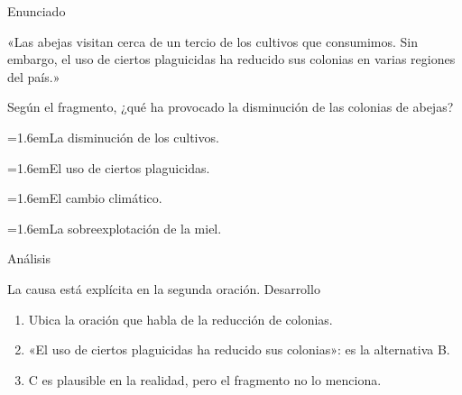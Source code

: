 \documentclass[10pt,a4paper,twocolumn]{article}
\newcommand{\alternativa}[2]{\par\noindent\hangindent=1.6em\hangafter=1\makebox[1.6em][l]{\tecla{#1}}#2\par}
\newcommand{\clave}[1]{\par\smallskip{\sffamily\footnotesize\color{esmeralda} Clave \teclaok{#1}}\par}
\begin{document}
\begin{ejemplo}
{\sffamily\footnotesize\color{zinc500} Enunciado}\par
«Las abejas visitan cerca de un tercio de los cultivos que consumimos. Sin embargo, el uso de ciertos plaguicidas ha reducido sus colonias en varias regiones del país.»

Según el fragmento, ¿qué ha provocado la disminución de las colonias de abejas?
\alternativa{A}{La disminución de los cultivos.}
\alternativa{B}{El uso de ciertos plaguicidas.}
\alternativa{C}{El cambio climático.}
\alternativa{D}{La sobreexplotación de la miel.}
\clave{B}
{\sffamily\footnotesize\color{zinc500} Análisis}\par La causa está explícita en la segunda oración.
{\sffamily\footnotesize\color{zinc500} Desarrollo}
\begin{enumerate}
  \item Ubica la oración que habla de la reducción de colonias.
  \item «El uso de ciertos plaguicidas ha reducido sus colonias»: es la alternativa B.
  \item C es plausible en la realidad, pero el fragmento no lo menciona.
\end{enumerate}
\end{ejemplo}
\end{document}

